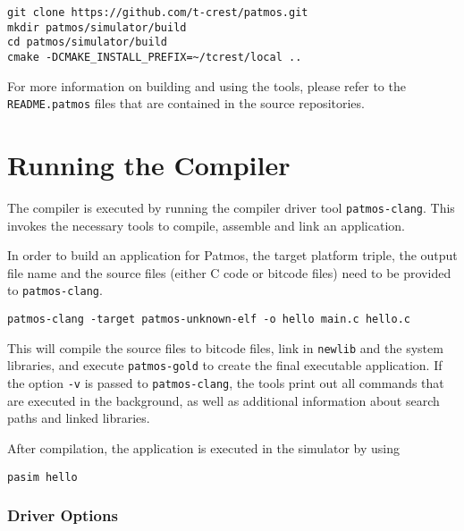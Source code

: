 \begin{verbatim}
git clone https://github.com/t-crest/patmos.git
mkdir patmos/simulator/build
cd patmos/simulator/build
cmake -DCMAKE_INSTALL_PREFIX=~/tcrest/local ..
\end{verbatim}


For more information on building and using the tools, please refer to the \texttt{README.patmos} files 
that are contained in the source repositories.


\section{Running the Compiler}


The compiler is executed by running the compiler driver tool \texttt{patmos-clang}. This invokes the 
necessary tools to compile, assemble and link an application. 

In order to build an application for Patmos, the target platform triple, the output file name and the source files (either C code or bitcode files) 
need to be provided to \texttt{patmos-clang}.

\begin{verbatim}
patmos-clang -target patmos-unknown-elf -o hello main.c hello.c
\end{verbatim}

This will compile the source files to bitcode files, link in \texttt{newlib} and the system libraries,
and execute \texttt{patmos-gold} to create the final executable application. If the option \texttt{-v} is passed
to \texttt{patmos-clang}, the tools print out all commands that are executed in the background, as well as additional information
about search paths and linked libraries.

After compilation, the application is executed in the simulator by using

\begin{verbatim}
pasim hello
\end{verbatim}

\subsubsection{Driver Options}

